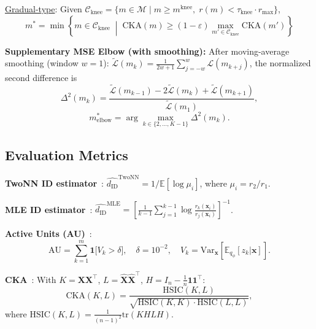 \documentclass[12pt,a4paper]{article}
\newcommand{\dID}{d_{\mathrm{ID}}}
\newcommand{\dz}{m}
\newcommand{\dzopt}{m^*}
\newcommand{\mknee}{m^{\mathrm{knee}}}
\begin{document}
\noindent\underline{Gradual-type}: Given $\mathcal{C}_\mathrm{knee} = \{m \in \mathcal{M} \mid m \geq \mknee,\; r(m) < \tau_{\mathrm{knee}} \cdot r_{\max}\}$,
\begin{equation}
  \dzopt = \min\!\left\{m \in \mathcal{C}_{\mathrm{knee}}
  \;\middle|\;
  \mathrm{CKA}(m) \geq (1-\varepsilon)\max_{m'\in\mathcal{C}_{\mathrm{knee}}}\mathrm{CKA}(m')
  \right\}
  \label{eq:dzopt_cka_knee}
\end{equation}

\textbf{Supplementary MSE Elbow (with smoothing):}
After moving-average smoothing (window $w=1$):
$\tilde{\mathcal{L}}(m_k) = \frac{1}{2w+1}\sum_{j=-w}^{w}\mathcal{L}(m_{k+j})$,
the normalized second difference is
\begin{equation}
  \Delta^2(m_k) = \frac{\tilde{\mathcal{L}}(m_{k-1}) - 2\tilde{\mathcal{L}}(m_k) + \tilde{\mathcal{L}}(m_{k+1})}
                        {\tilde{\mathcal{L}}(m_1)},
  \label{eq:elbow}
\end{equation}
\begin{equation}
  m^*_{\mathrm{elbow}} = \arg\max_{k \in \{2,\ldots,K-1\}} \Delta^2(m_k).
  \label{eq:elbow_def}
\end{equation}

\subsection{Evaluation Metrics}

\textbf{TwoNN ID estimator}~\cite{facco2017twonn}:
$\hat{\dID}^{\mathrm{TwoNN}} = 1/\mathbb{E}[\log \mu_i]$, where $\mu_i = r_2/r_1$.

\textbf{MLE ID estimator}~\cite{levina2005mle}:
$\hat{\dID}^{\mathrm{MLE}} = \left[\frac{1}{k-1}\sum_{j=1}^{k-1}\log\frac{r_k(\boldsymbol{x}_i)}{r_j(\boldsymbol{x}_i)}\right]^{-1}$.

\textbf{Active Units (AU)}~\cite{lucas2019elbo}:
\begin{equation}
  \mathrm{AU} = \sum_{k=1}^{\dz}
  \mathbf{1}\bigl[V_k > \delta\bigr],
  \quad \delta = 10^{-2}, \quad
  V_k = \mathrm{Var}_{\boldsymbol{x}}[\mathbb{E}_{q_\phi}[z_k|\boldsymbol{x}]].
  \label{eq:au}
\end{equation}

\textbf{CKA}~\cite{kornblith2019cka}:
With $K = \boldsymbol{X}\boldsymbol{X}^\top$, $L = \hat{\boldsymbol{X}}\hat{\boldsymbol{X}}^\top$, $H = I_n - \frac{1}{n}\boldsymbol{1}\boldsymbol{1}^\top$:
\begin{equation}
  \mathrm{CKA}(K, L)
  = \frac{\mathrm{HSIC}(K, L)}{\sqrt{\mathrm{HSIC}(K,K)\cdot\mathrm{HSIC}(L,L)}},
  \label{eq:cka}
\end{equation}
where $\mathrm{HSIC}(K, L) = \frac{1}{(n-1)^2}\mathrm{tr}(KHLH)$.
\end{document}
